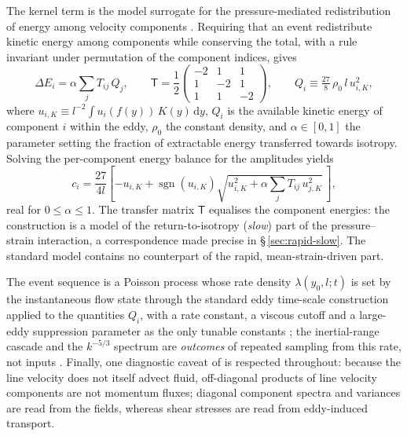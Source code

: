 \documentclass[lineno]{JFM-FLM_Au}
\begin{document}
The kernel term is the model surrogate for the pressure-mediated
redistribution of energy among velocity components
\citep{WunschKerstein2001,Kerstein2001}. Requiring that an event
redistribute kinetic energy among components while conserving the total,
with a rule invariant under permutation of the component indices, gives
\begin{equation}
  \Delta E_i = \alpha\sum_j T_{ij}\,Q_j,
  \qquad
  \mathsf{T}=\frac{1}{2}
  \begin{pmatrix}
    -2 & 1 & 1\\ 1 & -2 & 1\\ 1 & 1 & -2
  \end{pmatrix},
  \qquad
  Q_i\equiv\tfrac{27}{8}\,\rho_0\, l\, u_{i,K}^2,
  \label{eq:redistribution}
\end{equation}
where $u_{i,K}\equiv l^{-2}\!\int u_i(f(y))\,K(y)\,\mathrm{d}y$, $Q_i$ is
the available kinetic energy of component $i$ within the eddy, $\rho_0$
the constant density, and $\alpha\in[0,1]$ the parameter setting the
fraction of extractable energy transferred towards isotropy. Solving the
per-component energy balance for the amplitudes yields
\begin{equation}
  c_i = \frac{27}{4l}\left[-u_{i,K}
        +\operatorname{sgn}(u_{i,K})
        \sqrt{u_{i,K}^2+\alpha\sum_j T_{ij}\,u_{j,K}^2}\,\right],
  \label{eq:ci}
\end{equation}
real for $0\le\alpha\le1$. The transfer matrix $\mathsf{T}$ equalises the
component energies: the construction is a model of the
return-to-isotropy (\emph{slow}) part of the pressure--strain
interaction, a correspondence made precise in \S\,\ref{sec:rapid-slow}.
The standard model contains no counterpart of the rapid,
mean-strain-driven part.

The event sequence is a Poisson process whose rate density
$\lambda(y_0,l;t)$ is set by the instantaneous flow state through the
standard eddy time-scale construction applied to the quantities $Q_i$, with a rate constant, a viscous
cutoff and a large-eddy suppression parameter as the only tunable
constants \citep{Kerstein1999,StephensLignell2021}; the inertial-range
cascade and the $k^{-5/3}$ spectrum are \emph{outcomes} of repeated
sampling from this rate, not inputs \citep{Kerstein1999}. Finally, one
diagnostic caveat of \citet{Kerstein2001} is respected throughout:
because the line velocity does not itself advect fluid, off-diagonal
products of line velocity components are not momentum fluxes; diagonal
component spectra and variances are read from the fields, whereas shear
stresses are read from eddy-induced transport.
\end{document}
